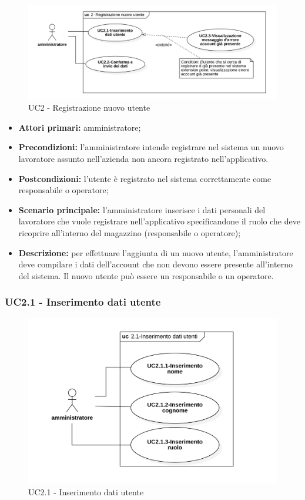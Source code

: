 \begin{figure}[H]
	\centering
	\includegraphics[scale=0.52]{res/images/uc2.png}
	\caption{UC2 - Registrazione nuovo utente}
\end{figure}
\begin{itemize}
	\item 	\textbf{Attori primari:} amministratore;
	\item 	\textbf{Precondizioni:}	l'amministratore intende registrare nel sistema un nuovo lavoratore assunto nell'azienda non ancora registrato nell'applicativo.
	\item 	\textbf{Postcondizioni:} l’utente è registrato nel sistema correttamente come responsabile o operatore;
	\item 	\textbf{Scenario principale:} l'amministratore inserisce i dati personali del lavoratore che vuole registrare nell'applicativo specificandone il ruolo che deve ricoprire all'interno del magazzino (responsabile o operatore);
	\item 	\textbf{Descrizione:} per effettuare l'aggiunta di un nuovo utente, l'amministratore deve compilare i dati dell'account che non devono essere presente all'interno del sistema. Il nuovo utente può essere un responsabile o un operatore.

\end{itemize}

\subsubsection{UC2.1 - Inserimento dati utente}

\begin{figure}[H]
	\centering
	\includegraphics[scale=0.52]{res/images/uc2-1.png}
	\caption{UC2.1 - Inserimento dati utente}
\end{figure}

